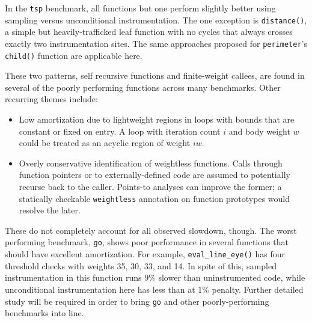 In the \texttt{tsp} benchmark, all functions but one perform slightly
better using sampling versus unconditional instrumentation.  The one
exception is \texttt{distance()}, a simple but heavily-trafficked leaf
function with no cycles that always crosses exactly two
instrumentation sites.  The same approaches proposed for
\texttt{perimeter}'s \texttt{child()} function are applicable here.

These two patterns, self recursive functions and finite-weight
callees, are found in several of the poorly performing functions
across many benchmarks.  Other recurring themes include:

\begin{itemize}
\item Low amortization due to lightweight regions in loops with bounds
  that are constant or fixed on entry.  A loop with iteration count
  $i$ and body weight $w$ could be treated as an acyclic region of
  weight $iw$.

\item Overly conservative identification of weightless functions.
  Calls through function pointers or to externally-defined code are
  assumed to potentially recurse back to the caller.  Points-to
  analyses can improve the former; a statically checkable
  \texttt{weightless} annotation on function prototypes would resolve
  the later.
\end{itemize}

These do not completely account for all observed slowdown, though.
The worst performing benchmark, \texttt{go}, shows poor performance in
several functions that should have excellent amortization.  For
example, \texttt{eval\_line\_eye()} has four threshold checks with
weights 35, 30, 33, and 14.  In spite of this, sampled instrumentation
in this function runs 9\% slower than uninstrumented code, while
unconditional instrumentation here has less than at 1\% penalty.
Further detailed study will be required in order to bring \texttt{go}
and other poorly-performing benchmarks into line.

